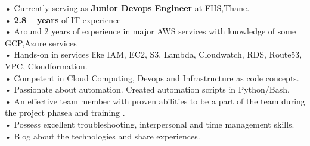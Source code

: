 \documentclass[9pt]{developercv} %
\begin{document}
\vspace{0.5cm}



\begin{minipage}[t]{1\textwidth} %
	\vspace{-\baselineskip} %
	
 • Currently  serving as \textbf{Junior Devops Engineer} at FHS,Thane. \\ • \textbf{2.8+ years} of IT experience  \\
    • Around 2 years of experience in major AWS services with knowledge of some GCP,Azure services \\
    • Hands-on in services like IAM, EC2, S3, Lambda, Cloudwatch, RDS, Route53, VPC, Cloudformation.\\
    • Competent in Cloud Computing, Devops and Infrastructure as code concepts. \\
    • Passionate about automation. Created automation scripts in Python/Bash.\\
    • An effective team member with proven abilities to be a part of the team during the project phasea and training .\\
    • Possess excellent troubleshooting, interpersonal and time management skills.\\
    • Blog about the technologies and share experiences. \\
    

\end{minipage}


\end{document}
